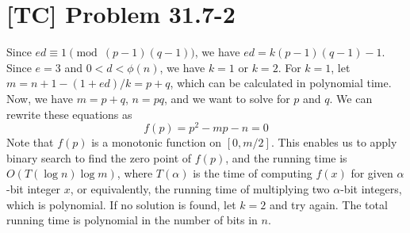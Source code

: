 \documentclass[a4paper,11pt]{article}
\begin{document}
  \section{[TC] Problem 31.7-2}
  Since $ed \equiv 1 \pmod{(p-1)(q-1)}$, we have $ed = k(p-1)(q-1) - 1$. Since $e = 3$ and $0 < d < \phi(n)$, we have $k = 1$ or $k = 2$. For $k = 1$, let $m = n + 1 - (1+ed)/k = p + q$, which can be calculated in polynomial time. Now, we have $m = p + q$, $n = pq$, and we want to solve for $p$ and $q$. We can rewrite these equations as
  $$f(p) = p^2 - mp - n = 0$$
  Note that $f(p)$ is a monotonic function on $[0, m/2]$. This enables us to apply binary search to find the zero point of $f(p)$, and the running time is $O(T(\log n) \log m)$, where $T(\alpha)$ is the time of computing $f(x)$ for given $\alpha$-bit integer $x$, or equivalently, the running time of multiplying two $\alpha$-bit integers, which is polynomial. If no solution is found, let $k = 2$ and try again. The total running time is polynomial in the number of bits in $n$.
\end{document}

